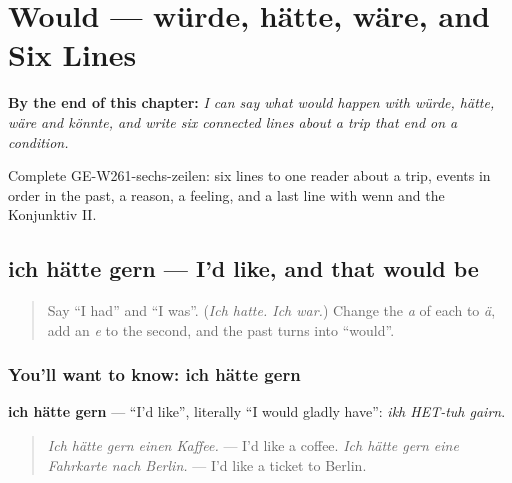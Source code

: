 
\chapter{Would — würde, hätte, wäre, and Six Lines}
\label{ch:ge-would}

\begin{chapteropening}
\textbf{By the end of this chapter:} \emph{I can say what would happen with würde, hätte, wäre and könnte, and write six connected lines about a trip that end on a condition.}

Complete GE-W261-sechs-zeilen: six lines to one reader about a trip, events in order in the past, a reason, a feeling, and a last line with wenn and the Konjunktiv II.
\end{chapteropening}

\section[ich hätte gern / das wäre]{ich hätte gern — I'd like, and that would be}

\label{lesson:GE-C261-ich-haette-gern}



\begin{quote}
Say \textquotedblleft{}I had\textquotedblright{} and \textquotedblleft{}I was\textquotedblright{}. (\emph{Ich hatte. Ich war.}) Change the \emph{a} of each to \emph{ä}, add an \emph{e} to the second, and the past turns into \textquotedblleft{}would\textquotedblright{}.
\end{quote}

\subsection*{You'll want to know: ich hätte gern}
\textbf{ich hätte gern} — \textquotedblleft{}I'd like\textquotedblright{}, literally \textquotedblleft{}I would gladly have\textquotedblright{}: \emph{ikh HET-tuh gairn}.

\begin{quote}
\emph{Ich hätte gern einen Kaffee.} — I'd like a coffee. \emph{Ich hätte gern eine Fahrkarte nach Berlin.} — I'd like a ticket to Berlin.
\end{quote}

